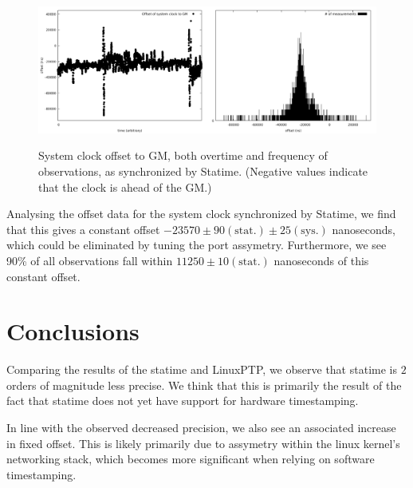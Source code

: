 \documentclass{article}
\begin{document}
\begin{figure}[h]
\includegraphics[width=0.5\textwidth]{gm_statime_offset_overtime.pdf}\includegraphics[width=0.5\textwidth]{gm_statime_offset.pdf}
\caption{System clock offset to GM, both overtime and frequency of observations, as synchronized by Statime. (Negative values indicate that the clock is ahead of the GM.)}
\label{fig:statime_sys_offset}
\end{figure}

Analysing the offset data for the system clock synchronized by Statime, we find that this gives a constant offset $-23570\pm 90(\text{stat.})\pm 25 (\text{sys.})$ nanoseconds, which could be eliminated by tuning the port assymetry. Furthermore, we see 90\% of all observations fall within $11250 \pm 10(\text{stat.})$ nanoseconds of this constant offset.

\section{Conclusions}

Comparing the results of the statime and LinuxPTP, we observe that statime is $2$ orders of magnitude less precise. We think that this is primarily the result of the fact that statime does not yet have support for hardware timestamping.

In line with the observed decreased precision, we also see an associated increase in fixed offset. This is likely primarily due to assymetry within the linux kernel's networking stack, which becomes more significant when relying on software timestamping.
\end{document}

